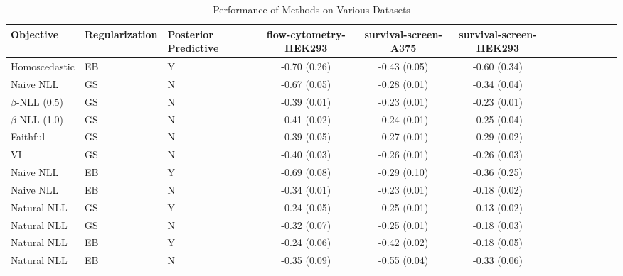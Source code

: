 \begin{table}
\centering
\caption{Performance of Methods on Various Datasets}
\label{tab:results}
\begin{tabular}{|l|l|l|c|c|c|c|c|c|c|c|c|c|}
\toprule
        Objective & Regularization & Posterior Predictive & flow-cytometry-HEK293 & survival-screen-A375 & survival-screen-HEK293 \\
\midrule
    Homoscedastic &             EB &                    Y &          -0.70 (0.26) &         -0.43 (0.05) &           -0.60 (0.34) \\
        Naive NLL &             GS &                    N &          -0.67 (0.05) &         -0.28 (0.01) &           -0.34 (0.04) \\
$\beta$-NLL (0.5) &             GS &                    N &          -0.39 (0.01) &         -0.23 (0.01) &           -0.23 (0.01) \\
$\beta$-NLL (1.0) &             GS &                    N &          -0.41 (0.02) &         -0.24 (0.01) &           -0.25 (0.04) \\
         Faithful &             GS &                    N &          -0.39 (0.05) &         -0.27 (0.01) &           -0.29 (0.02) \\
               VI &             GS &                    N &          -0.40 (0.03) &         -0.26 (0.01) &           -0.26 (0.03) \\
        Naive NLL &             EB &                    Y &          -0.69 (0.08) &         -0.29 (0.10) &           -0.36 (0.25) \\
        Naive NLL &             EB &                    N &          -0.34 (0.01) &         -0.23 (0.01) &           -0.18 (0.02) \\
      Natural NLL &             GS &                    Y &          -0.24 (0.05) &         -0.25 (0.01) &           -0.13 (0.02) \\
      Natural NLL &             GS &                    N &          -0.32 (0.07) &         -0.25 (0.01) &           -0.18 (0.03) \\
      Natural NLL &             EB &                    Y &          -0.24 (0.06) &         -0.42 (0.02) &           -0.18 (0.05) \\
      Natural NLL &             EB &                    N &          -0.35 (0.09) &         -0.55 (0.04) &           -0.33 (0.06) \\
\bottomrule
\end{tabular}
\end{table}
